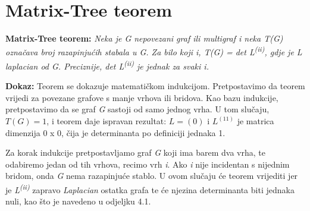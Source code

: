 \documentclass[times, utf8, zavrsni]{fer}
\begin{document}
\section{Matrix-Tree teorem}

\textbf{Matrix-Tree teorem:} \textit{Neka je G nepovezani graf ili multigraf i neka T(G) označava broj razapinjućih stabala u G. Za bilo koji i, T(G) = det L\textsuperscript{(ii)}, gdje je L laplacian od G. Preciznije, det L\textsuperscript{(ii)} je jednak za svaki i.}

\textbf{Dokaz:} Teorem se dokazuje matematičkom indukcijom. Pretpostavimo da teorem vrijedi za povezane grafove s manje vrhova ili bridova. Kao bazu indukcije, pretpostavimo da se graf \textit{G} sastoji od samo jednog vrha. U tom slučaju, $T(G) = 1$, i teorem daje ispravan rezultat: $L = (0)$ i $L^{(11)}$ je matrica dimenzija 0 x 0, čija je determinanta po definiciji jednaka 1.

Za korak indukcije pretpostavljamo graf \textit{G} koji ima barem dva vrha, te odabiremo jedan od tih vrhova, recimo vrh \textit{i}. Ako \textit{i} nije incidentan s nijednim bridom, onda \textit{G} nema razapinjuće stablo. U ovom slučaju će teorem vrijediti jer je \textit{L\textsuperscript{(ii)}} zapravo \textit{Laplacian} ostatka grafa te će njezina determinanta biti jednaka nuli, kao što je navedeno u odjeljku 4.1.
\end{document}
